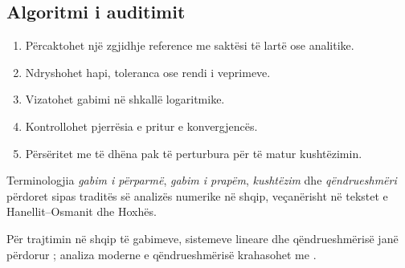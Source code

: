 \subsection{Algoritmi i auditimit}
\begin{enumerate}
\item Përcaktohet një zgjidhje reference me saktësi të lartë ose analitike.
\item Ndryshohet hapi, toleranca ose rendi i veprimeve.
\item Vizatohet gabimi në shkallë logaritmike.
\item Kontrollohet pjerrësia e pritur e konvergjencës.
\item Përsëritet me të dhëna pak të perturbura për të matur kushtëzimin.
\end{enumerate}

Terminologjia \emph{gabim i përparmë}, \emph{gabim i prapëm}, \emph{kushtëzim} dhe \emph{qëndrueshmëri} përdoret sipas traditës së analizës numerike në shqip, veçanërisht në tekstet e Hanellit--Osmanit dhe Hoxhës.

Për trajtimin në shqip të gabimeve, sistemeve lineare dhe qëndrueshmërisë janë përdorur \cite{hanelli,hoxha,datja}; analiza moderne e qëndrueshmërisë krahasohet me \cite{higham}.
